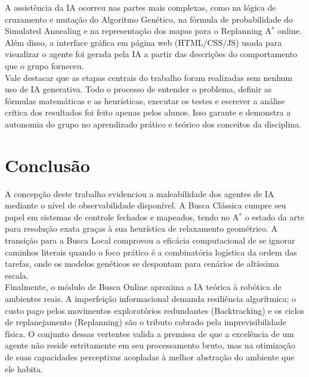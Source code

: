 \documentclass[12pt,a4paper]{article}
\begin{document}
A assistência da IA ocorreu nas partes mais complexas, como na lógica de cruzamento e mutação do Algoritmo Genético, na fórmula de probabilidade do Simulated Annealing e na representação dos mapas para o Replanning A$^*$ online. Além disso, a interface gráfica em página web (HTML/CSS/JS) usada para visualizar o agente foi gerada pela IA a partir das descrições do comportamento que o grupo forneceu.
\\

Vale destacar que as etapas centrais do trabalho foram realizadas sem nenhum uso de IA generativa. Todo o processo de entender o problema, definir as fórmulas matemáticas e as heurísticas, executar os testes e escrever a análise crítica dos resultados foi feito apenas pelos alunos. Isso garante e demonstra a autonomia do grupo no aprendizado prático e teórico dos conceitos da disciplina.

\section{Conclusão}
A concepção deste trabalho evidenciou a maleabilidade dos agentes de IA mediante o nível de observabilidade disponível. A Busca Clássica cumpre seu papel em sistemas de controle fechados e mapeados, tendo no A$^*$ o estado da arte para resolução exata graças à sua heurística de relaxamento geométrico. A transição para a Busca Local comprovou a eficácia computacional de se ignorar caminhos literais quando o foco prático é a combinatória logística da ordem das tarefas, onde os modelos genéticos se despontam para cenários de altíssima escala.
\\

Finalmente, o módulo de Busca Online aproxima a IA teórica à robótica de ambientes reais. A imperfeição informacional demanda resiliência algorítmica; o custo pago pelos movimentos exploratórios redundantes (Backtracking) e os ciclos de replanejamento (Replanning) são o tributo cobrado pela imprevisibilidade física. O conjunto dessas vertentes valida a premissa de que a excelência de um agente não reside estritamente em seu processamento bruto, mas na otimização de suas capacidades perceptivas acopladas à melhor abstração do ambiente que ele habita.
\end{document}
